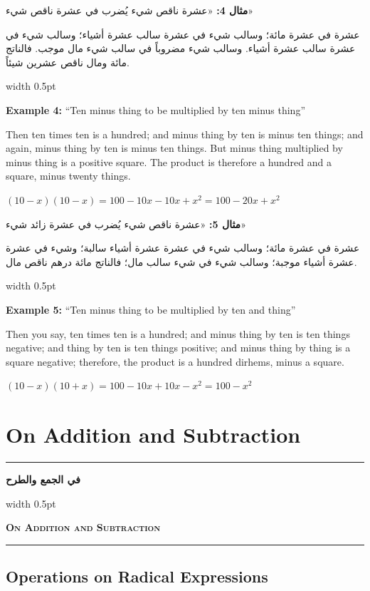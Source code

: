 \documentclass[10pt,a4paper]{book}
\newlength{\colwidth}
\newcommand{\bilingualpair}[2]{%
  \noindent
  \begin{minipage}[t]{\colwidth}
  \begin{flushright}
  \vspace{0pt}
  {\arabicfont\small #1}
  \end{flushright}
  \end{minipage}%
  \hfill\textcolor{columnsepclr}{\vrule width 0.5pt}\hfill
  \begin{minipage}[t]{\colwidth}
  \vspace{0pt}
  {\small #2}
  \end{minipage}%
  \par\vspace{0.6em}
}
\newcommand{\bilingualsectionheader}[2]{%
  \par\vspace{0.8em}
  \noindent
  \begin{minipage}[t]{\colwidth}
  \begin{flushright}
  \textbf{\arabicfont #1}
  \end{flushright}
  \end{minipage}%
  \hfill\textcolor{columnsepclr}{\vrule width 0.5pt}\hfill
  \begin{minipage}[t]{\colwidth}
  \textbf{\textsc{#2}}
  \end{minipage}%
  \par\vspace{0.5em}
}
\begin{document}
\bilingualpair{
\textbf{مثال 4:} «عشرة ناقص شيء يُضرب في عشرة ناقص شيء»

عشرة في عشرة مائة؛ وسالب شيء في عشرة سالب عشرة أشياء؛
وسالب شيء في عشرة سالب عشرة أشياء. وسالب شيء مضروباً
في سالب شيء مال موجب. فالناتج مائة ومال ناقص عشرين شيئاً.
}{
\textbf{Example 4:} ``Ten minus thing to be multiplied by ten minus thing''

Then ten times ten is a hundred; and minus thing by ten is minus ten things;
and again, minus thing by ten is minus ten things. But minus thing
multiplied by minus thing is a positive square. The product is therefore a
hundred and a square, minus twenty things.

$(10 - x)(10 - x) = 100 - 10x - 10x + x^2 = 100 - 20x + x^2$
}

\bilingualpair{
\textbf{مثال 5:} «عشرة ناقص شيء يُضرب في عشرة زائد شيء»

عشرة في عشرة مائة؛ وسالب شيء في عشرة عشرة أشياء سالبة؛
وشيء في عشرة عشرة أشياء موجبة؛ وسالب شيء في شيء سالب
مال؛ فالناتج مائة درهم ناقص مال.
}{
\textbf{Example 5:} ``Ten minus thing to be multiplied by ten and thing''

Then you say, ten times ten is a hundred; and minus thing by ten is ten
things negative; and thing by ten is ten things positive; and minus thing by
thing is a square negative; therefore, the product is a hundred dirhems,
minus a square.

$(10 - x)(10 + x) = 100 - 10x + 10x - x^2 = 100 - x^2$
}

\newpage

\chapter{On Addition and Subtraction}
\label{ch:addition}

\noindent\textcolor{columnsepclr}{\rule{\textwidth}{0.6pt}}\par\vspace{0.3em}
\bilingualsectionheader{في الجمع والطرح}{On Addition and Subtraction}
\noindent\textcolor{columnsepclr}{\rule{\textwidth}{0.6pt}}\par\vspace{0.5em}

\section{Operations on Radical Expressions}
\end{document}
